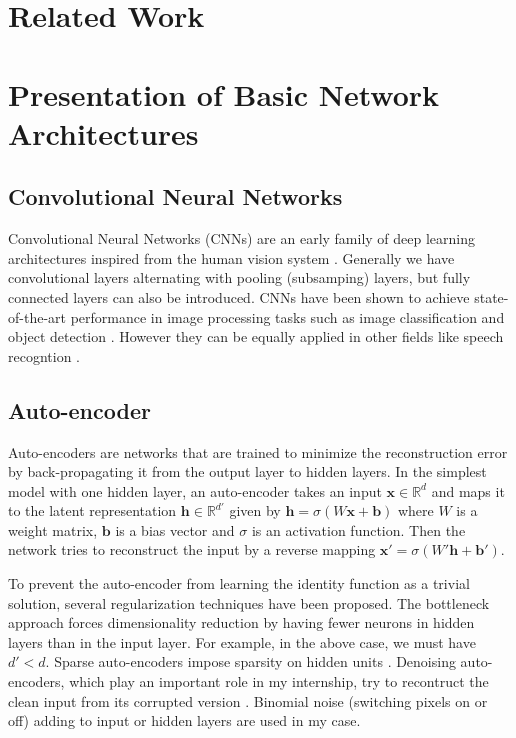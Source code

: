 \section{Related Work} \label{section:related}

\section{Presentation of Basic Network Architectures}
\label{section:networks}

\subsection{Convolutional Neural Networks}

Convolutional Neural Networks (CNNs) are an early family of deep learning
architectures inspired from the human vision system \cite{Y. LeCun 1998}.
Generally we have convolutional layers alternating with pooling
(subsamping) layers, but fully connected layers can also be introduced.
CNNs have been shown to achieve state-of-the-art performance in
image processing tasks such as image classification
\cite{A. Krizhevsky 2012} and object detection \cite{Y. LeCun 2010}.
However they can be equally applied in other fields like speech recogntion
\cite{L. Deng 2013}.

\subsection{Auto-encoder}

Auto-encoders are networks that are trained to minimize the reconstruction
error by back-propagating it from the output layer to hidden layers.
In the simplest model with one hidden layer, an auto-encoder takes an
input $\mathbf{x} \in \mathbb{R}^d$ and maps it to the latent
representation $\mathbf{h} \in \mathbb{R}^{d'}$ given by
$\mathbf{h} = \sigma(W\mathbf{x}+\mathbf{b})$ where $W$
is a weight matrix, $\mathbf{b}$ is a bias vector and $\sigma$ is an
activation function. Then the network tries to reconstruct the input
by a reverse mapping $\mathbf{x'} = \sigma(W'\mathbf{h}+\mathbf{b'})$.

To prevent the auto-encoder from learning the identity function as
a trivial solution, several regularization techniques have been proposed.
The bottleneck approach forces dimensionality reduction by having
fewer neurons in hidden layers than in the input layer. For example,
in the above case, we must have $d'<d$. Sparse auto-encoders impose sparsity
on hidden units \cite{A. Makhzani 2014}.
Denoising auto-encoders, which play an important role in my internship,
try to recontruct the clean input from its corrupted version
\cite{P. Vincent 2008, Y. Bengio 2012}. Binomial noise
(switching pixels on or off) adding
to input or hidden layers are used in my case.

